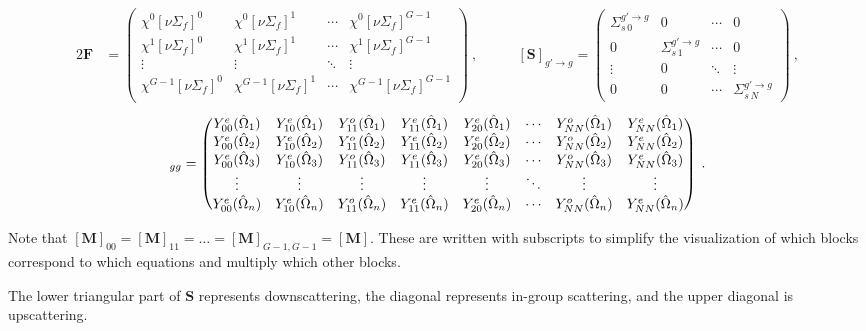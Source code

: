 \documentclass[12pt]{article}
\newcommand{\ve}[1]{\ensuremath{\mathbf{#1}}}
\newcommand{\Macro}{\ensuremath{\Sigma}}
\newcommand{\vOmega}{\ensuremath{\hat{\Omega}}}
\newcommand{\Ye}[2]{\ensuremath{Y^e_{#1}(\vOmega_#2)}}
\newcommand{\Yo}[2]{\ensuremath{Y^o_{#1}(\vOmega_#2)}}
\newcommand{\sigg}[1]{\ensuremath{\Macro^{g'\rightarrow g}_{s\,#1}}}
\begin{document}
 \begin{alignat}{2}
      \mathbf{F}  &=     \begin{pmatrix}
     \chi^{0}[\nu\Macro_{f}]^{0} &\chi^{0}[\nu\Macro_{f}]^{1} & \cdots &
      \chi^{0}[\nu\Macro_{f}]^{G-1} \\
      \chi^{1}[\nu\Macro_{f}]^{0} &\chi^{1}[\nu\Macro_{f}]^{1} & \cdots &
      \chi^{1}[\nu\Macro_{f}]^{G-1}\\
      \vdots & \vdots & \ddots & \vdots \\
      \chi^{G-1}[\nu\Macro_{f}]^{0} &\chi^{G-1}[\nu\Macro_{f}]^{1} & \cdots &
      \chi^{G-1}[\nu\Macro_{f}]^{G-1}\\
    \end{pmatrix} \:, \nonumber & \qquad
  [\ve{S}]_{g'\rightarrow g} = \begin{pmatrix}
    \sigg{0} & 0 & \cdots & 0  \\
    0 & \sigg{1} & \cdots & 0 \\
    \vdots & 0 & \ddots  & \vdots \\
     0 & 0 & \cdots & \sigg{N}
  \end{pmatrix}\:, \nonumber
 \end{alignat}
\begin{equation}    
   [\ve{M}]_{gg} = \begin{pmatrix}
    \Ye{00}{1} & \Ye{10}{1} & \Yo{11}{1} & \Ye{11}{1} & 
    \Ye{20}{1} & \cdots & \Yo{NN}{1} & \Ye{NN}{1} \\
    \Ye{00}{2} & \Ye{10}{2} & \Yo{11}{2} & \Ye{11}{2} & 
    \Ye{20}{2} & \cdots & \Yo{NN}{2} & \Ye{NN}{2} \\
    \Ye{00}{3} & \Ye{10}{3} & \Yo{11}{3} & \Ye{11}{3} & 
    \Ye{20}{3} & \cdots & \Yo{NN}{3} & \Ye{NN}{3} \\
    \vdots     & \vdots     & \vdots     & \vdots     & 
    \vdots     &  \ddots    & \vdots     & \vdots     \\
    \Ye{00}{n} & \Ye{10}{n} & \Yo{11}{n} & \Ye{11}{n} & 
    \Ye{20}{n} & \cdots & \Yo{NN}{n} & \Ye{NN}{n}
  \end{pmatrix}\:. \nonumber \\
\end{equation}

\noindent Note that $[\ve{M}]_{00} = [\ve{M}]_{11} =  \hdots = [\ve{M}]_{G-1,G-1} = [\ve{M}]$. These are written with subscripts to simplify the visualization of which blocks correspond to which equations and multiply which other blocks.

The lower
triangular part of $\ve{S}$ represents downscattering, the diagonal represents
in-group scattering, and the upper diagonal is upscattering. 
\end{document}
